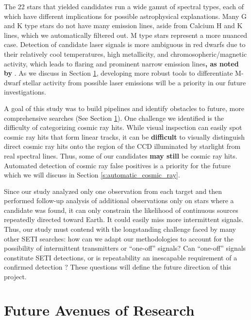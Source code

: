 \documentclass[linenumbers]{aastex701}
\providecommand{\DIFadd}[1]{{\bf #1}} %
\providecommand{\DIFaddbegin}{} %
\providecommand{\DIFaddend}{} %
\begin{document}
The 22 stars that yielded candidates run a wide gamut of spectral types, each of which have different implications for possible astrophysical explanations. Many G and K type stars do not have many emission lines, aside from  Calcium H and K lines, which we automatically filtered out. M type stars represent a more nuanced case. Detection of candidate laser signals is more ambiguous in red dwarfs due to their relatively cool temperatures, high metallicity, and chromosopheric/magnetic activity, which leads to flaring and prominent narrow emission lines\DIFaddbegin \DIFadd{, as noted by }\DIFaddend \citep{Marcy_2021}. As we discuss in Section \ref{s:future}, developing more robust tools to differentiate M-dwarf stellar activity from possible laser emissions will be a priority in our future investigations. 

A goal of this study was to build pipelines and identify obstacles to future, more comprehensive searches (See Section \ref{s:future}).  One challenge we identified is the difficulty of categorizing cosmic ray hits.  While visual inspection can easily spot cosmic ray hits that form linear tracks, it can be  \DIFaddbegin \DIFadd{difficult  }\DIFaddend to visually distinguish direct cosmic ray hits onto the region of the CCD illuminated by starlight from real spectral lines.  Thus, some  of our candidates  \DIFaddbegin \DIFadd{may still }\DIFaddend be cosmic ray hits.  Automated detection of cosmic ray false positives is a priority for the future which we will discuss in Section \ref{s:automatic_cosmic_ray}. 

Since our study analyzed only one observation from each target and then performed follow-up analysis of additional observations only on stars where a candidate was found, it can only constrain the likelihood of continuous sources repeatedly directed toward Earth. It could easily miss more intermittent signals. Thus, our study must contend with the longstanding challenge faced by many other SETI searches: how can we adapt our methodologies to account for the possibility of intermittent transmitters or  \DIFaddbegin \enquote{one-off} \DIFaddend signals?  Can  \DIFaddbegin \enquote{one-off} \DIFaddend signals constitute SETI detections, or is repeatability an inescapable requirement of a confirmed detection \citep{2019nasatechnosignatures, Wow!Signal}? These questions will define the future direction of this project.

\section{Future Avenues of Research}
\label{s:future}
\end{document}
